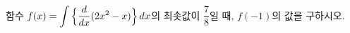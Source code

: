 함수 $f(x)=\displaystyle\int\Big\{\dfrac{d}{dx}(2x^2-x)\Big\}\mkern3mu dx$의 최솟값이 $\dfrac{7}{8}$일 때, $f(-1)$의 값을 구하시오.
